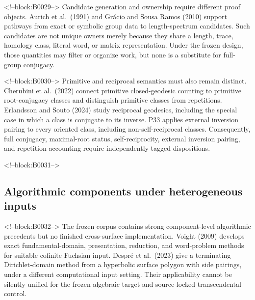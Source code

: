 \documentclass[11pt,a4paper]{article}
\begin{document}
<!--block:B0029-->
Candidate generation and ownership require different proof objects. Aurich et al.~(1991)
\citep{P33-S05}
 and Grácio and Sousa Ramos (2010)
\citep{P33-S09}
 support pathways from exact or symbolic group data to length-spectrum candidates. Such candidates are not unique owners merely because they share a length, trace, homology class, literal word, or matrix representation. Under the frozen design, those quantities may filter or organize work, but none is a substitute for full-group conjugacy.

<!--block:B0030-->
Primitive and reciprocal semantics must also remain distinct. Cherubini et al.~(2022)
\citep{P33-S14}
 connect primitive closed-geodesic counting to primitive root-conjugacy classes and distinguish primitive classes from repetitions. Erlandsson and Souto (2024)
\citep{P33-S15}
 study reciprocal geodesics, including the special case in which a class is conjugate to its inverse. P33 applies external inversion pairing to every oriented class, including non-self-reciprocal classes. Consequently, full conjugacy, maximal-root status, self-reciprocity, external inversion pairing, and repetition accounting require independently tagged dispositions.

<!--block:B0031-->
\hypertarget{algorithmic-components-under-heterogeneous-inputs}{%
\subsection{Algorithmic components under heterogeneous inputs}\label{algorithmic-components-under-heterogeneous-inputs}}

<!--block:B0032-->
The frozen corpus contains strong component-level algorithmic precedents but no finished cross-surface implementation. Voight (2009)
\citep{P33-S10}
 develops exact fundamental-domain, presentation, reduction, and word-problem methods for suitable cofinite Fuchsian input. Despré et al.~(2023)
\citep{P33-S11}
 give a terminating Dirichlet-domain method from a hyperbolic surface polygon with side pairings, under a different computational input setting. Their applicability cannot be silently unified for the frozen algebraic target and source-locked transcendental control.
\end{document}

